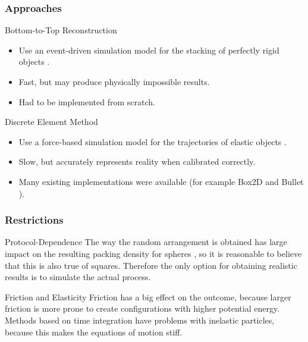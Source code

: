 \documentclass[sumlimits, intlimits]{beamer}
\begin{document}
\begin{frame}
\frametitle{Approaches}
\begin{block}{Bottom-to-Top Reconstruction}
\begin{itemize}
\item Use an event-driven simulation model
for the stacking of perfectly rigid objects \cite{poschel-2005}.
\item Fast, but may produce physically impossible results.
\item Had to be implemented from scratch.
\end{itemize}
\end{block}
\begin{block}{Discrete Element Method}
\begin{itemize}
\item Use a force-based simulation model
for the trajectories of elastic objects \cite{poschel-2005}.
\item Slow, but accurately represents reality when calibrated correctly.
\item Many existing implementations were available
(for example Box2D \cite{box2d} and Bullet \cite{bullet}).
\end{itemize}
\end{block}
\end{frame}

\begin{frame}
\frametitle{Restrictions}
\begin{block}{Protocol-Dependence}
The way the random arrangement is obtained has large impact on the resulting packing density for spheres \cite{torquato-2002},
so it is reasonable to believe that this is also true of squares.
Therefore the only option for obtaining realistic results is
to simulate the actual process.
\end{block}
\begin{block}{Friction and Elasticity}
Friction has a big effect on the outcome,
because larger friction is more prone to create configurations with higher potential energy.
Methods based on time integration have problems with inelastic particles,
because this makes the equations of motion stiff.
\end{block}
\end{frame}
\end{document}
